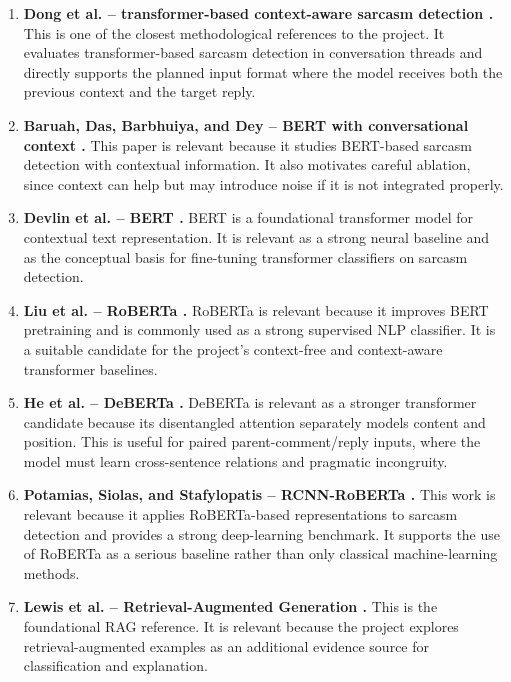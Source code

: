\documentclass[%
 reprint,
 amsmath,amssymb,
 aps,
]{revtex4-2}
\begin{document}
\begin{enumerate}[leftmargin=*, itemsep=0.65em]
\item \textbf{Dong et al. -- transformer-based context-aware sarcasm detection \cite{dong2020transformer}.} This is one of the closest methodological references to the project. It evaluates transformer-based sarcasm detection in conversation threads and directly supports the planned input format where the model receives both the previous context and the target reply.

\item \textbf{Baruah, Das, Barbhuiya, and Dey -- BERT with conversational context \cite{baruah2020context}.} This paper is relevant because it studies BERT-based sarcasm detection with contextual information. It also motivates careful ablation, since context can help but may introduce noise if it is not integrated properly.

\item \textbf{Devlin et al. -- BERT \cite{devlin2019bert}.} BERT is a foundational transformer model for contextual text representation. It is relevant as a strong neural baseline and as the conceptual basis for fine-tuning transformer classifiers on sarcasm detection.

\item \textbf{Liu et al. -- RoBERTa \cite{liu2019roberta}.} RoBERTa is relevant because it improves BERT pretraining and is commonly used as a strong supervised NLP classifier. It is a suitable candidate for the project's context-free and context-aware transformer baselines.

\item \textbf{He et al. -- DeBERTa \cite{he2021deberta}.} DeBERTa is relevant as a stronger transformer candidate because its disentangled attention separately models content and position. This is useful for paired parent-comment/reply inputs, where the model must learn cross-sentence relations and pragmatic incongruity.

\item \textbf{Potamias, Siolas, and Stafylopatis -- RCNN-RoBERTa \cite{potamias2020roberta}.} This work is relevant because it applies RoBERTa-based representations to sarcasm detection and provides a strong deep-learning benchmark. It supports the use of RoBERTa as a serious baseline rather than only classical machine-learning methods.

\item \textbf{Lewis et al. -- Retrieval-Augmented Generation \cite{lewis2020retrieval}.} This is the foundational RAG reference. It is relevant because the project explores retrieval-augmented examples as an additional evidence source for classification and explanation.


\end{enumerate}
\end{document}
